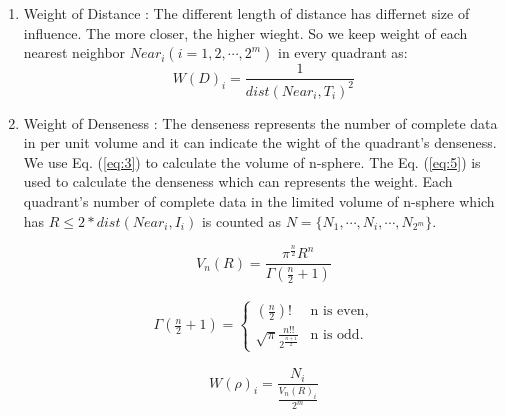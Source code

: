 \documentclass[print]{jicspack}
\begin{document}
\begin{enumerate}[(1)]
\item Weight of Distance : The different length of distance has differnet size of influence. The more closer, the higher wieght. So we keep weight of each nearest neighbor $Near_i (i=1, 2, \cdots, 2^m)$ in every quadrant as:
\begin{equation}
\label{eq:2}
W(D)_i = \frac{1}{dist(Near_i, T_i)^2}
\end{equation}
\item Weight of Denseness : The denseness represents the number of complete data in per unit volume and it can indicate the wight of the quadrant's denseness. We use Eq. (\ref{eq:3}) to calculate the volume of n-sphere. The Eq. (\ref{eq:5}) is used to calculate the denseness which can represents the weight. Each quadrant's number of complete data in the limited volume of n-sphere which has $R \leq 2 * dist(Near_i, I_i)$ is counted as $N = \{N_1, \cdots, N_i, \cdots, N_{2^m}\}$.

\begin{equation}
\label{eq:3}
V_n(R) = \frac{\pi^{\frac{n}{2}}R^n}{\Gamma (\frac{n}{2} + 1)}
\end{equation}

\begin{eqnarray}\label{eq:4}
\Gamma(\frac{n}{2} + 1) = \left\{\begin{array}{ll}(\frac{n}{2})! & \mbox{n is even} ,\\\sqrt{\pi}\frac{n!!}{2^{\frac{n+1}{2}}} & \mbox{n is odd}.\end{array}\right.
\end{eqnarray}

\begin{equation}
\label{eq:5}
W(\rho)_i = \frac{N_i}{\frac{V_n(R)_i}{2^m}}
\end{equation}


\end{enumerate}
\end{document}

